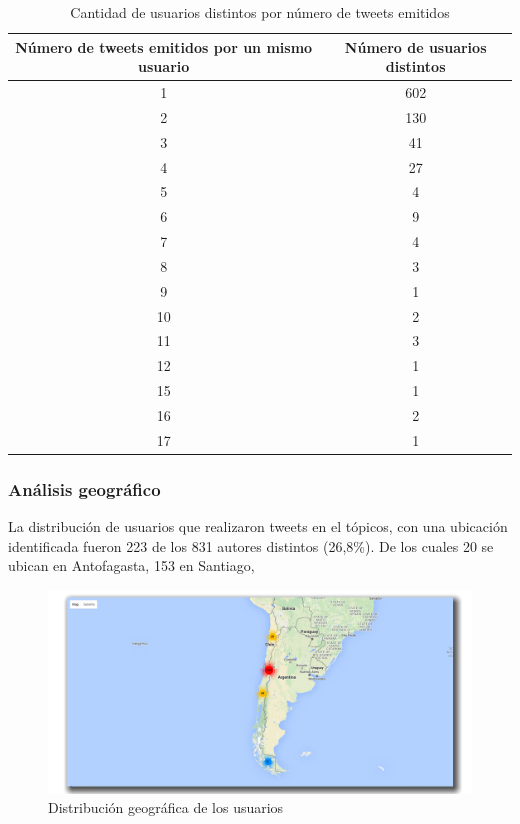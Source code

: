 \begin{table}[H]
	\centering
	\begin{tabular}{| c | c |}
		\hline
		\multicolumn{1}{|p{3cm}|}{Número de tweets emitidos por un mismo usuario} & \multicolumn{1}{p{3cm}|}{Número de usuarios  distintos} \\ \hline
		1 & 602 \\ \hline
		2 & 130 \\ \hline
		3 & 41  \\ \hline
		4 & 27 \\ \hline
		5 & 4  \\ \hline
		6 & 9  \\ \hline
		7 & 4  \\ \hline
		8 & 3  \\ \hline
		9 & 1  \\ \hline
		10 & 2  \\ \hline
		11 & 3  \\ \hline
		12 & 1  \\ \hline
		15 & 1  \\ \hline
		16 & 2  \\ \hline
		17 & 1  \\ \hline
	\end{tabular}
	\caption {Cantidad de usuarios distintos por número de tweets emitidos}
\end{table}

\subsubsection{Análisis geográfico}

La distribución de usuarios que realizaron tweets en el tópicos, con una ubicación 
identificada fueron 223 de los 831 autores distintos (26,8\%). De los cuales 20 se ubican en Antofagasta, 153 en Santiago, 

\begin{figure}[H]
	\centering
	\includegraphics[width=1\textwidth]{imgs/213_usuarios_mapa.png}
	\caption{Distribución geográfica de los usuarios}
	\label{fig:geo_usuarios_213}
\end{figure}

